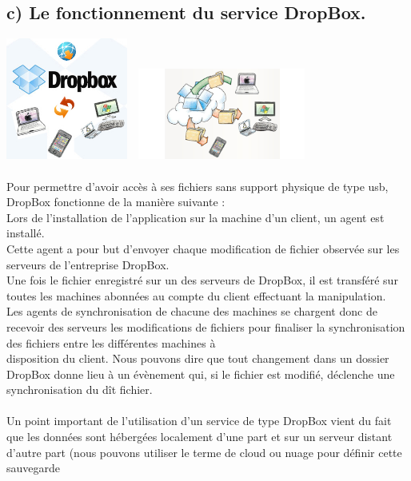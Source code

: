 \documentclass[a4paper, 10pt]{article}
\begin{document}
\subsection*{c) Le fonctionnement du service DropBox.}
\includegraphics[height = 4cm, width = 4cm]{jpg/dropbox_1.png}
\includegraphics[height = 3cm, width = 6cm]{jpg/dropbox_3.jpg}\\ \\
Pour permettre d'avoir accès à ses fichiers sans support physique de type usb, DropBox fonctionne de la manière suivante :\\
Lors de l'installation de l'application sur la machine d'un client, un agent est installé.\\
Cette agent a pour but d'envoyer chaque modification de fichier observée sur les serveurs de l'entreprise DropBox.\\
Une fois le fichier enregistré sur un des serveurs de DropBox, il est transféré sur toutes les machines abonnées
au compte du client effectuant la manipulation.\\
Les agents de synchronisation de chacune des machines se chargent donc de recevoir des serveurs les modifications de fichiers pour
finaliser la synchronisation des fichiers entre les différentes machines à\\disposition du client.
Nous pouvons dire que tout changement dans un dossier DropBox donne lieu à un évènement qui, si le fichier est modifié,
déclenche une synchronisation du dît fichier.\\ \\
Un point important de l'utilisation d'un service de type DropBox vient du fait que les données sont hébergées localement d'une part
et sur un serveur distant d'autre part (nous pouvons utiliser le terme de cloud ou nuage pour définir cette sauvegarde
\end{document}
